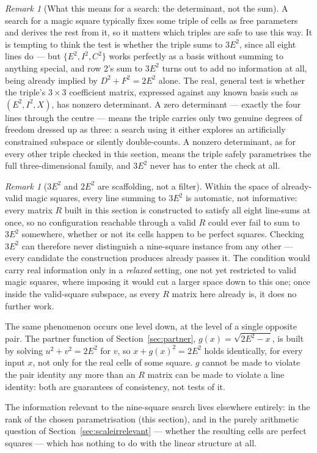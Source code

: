 \documentclass[12pt]{article}
\theoremstyle{remark}
\newtheorem{remark}[theorem]{Remark}
\begin{document}
\begin{remark}[What this means for a search: the determinant, not the sum]
A search for a magic square typically fixes some triple of cells as
free parameters and derives the rest from it, so it matters which
triples are safe to use this way. It is tempting to think the test is
whether the triple sums to $3E^2$, since all eight lines do --- but
$\{E^2,I^2,C^2\}$ works perfectly as a basis without summing to
anything special, and row 2's sum to $3E^2$ turns out to add no
information at all, being already implied by $D^2+F^2=2E^2$ alone.
The real, general test is whether the triple's $3\times3$ coefficient
matrix, expressed against any known basis such as $(E^2,I^2,X)$, has
nonzero determinant. A zero determinant --- exactly the four lines
through the centre --- means the triple carries only two genuine
degrees of freedom dressed up as three: a search using it either
explores an artificially constrained subspace or silently
double-counts. A nonzero determinant, as for every other triple
checked in this section, means the triple safely parametrises the
full three-dimensional family, and $3E^2$ never has to enter the
check at all.
\end{remark}

\begin{remark}[$3E^2$ and $2E^2$ are scaffolding, not a filter]
Within the space of already-valid magic squares, every line summing
to $3E^2$ is automatic, not informative: every matrix $R$ built in
this section is constructed to satisfy all eight line-sums at once,
so no configuration reachable through a valid $R$ could ever fail to
sum to $3E^2$ somewhere, whether or not its cells happen to be
perfect squares. Checking $3E^2$ can therefore never distinguish a
nine-square instance from any other --- every candidate the
construction produces already passes it. The condition would carry
real information only in a \emph{relaxed} setting, one not yet
restricted to valid magic squares, where imposing it would cut a
larger space down to this one; once inside the valid-square subspace,
as every $R$ matrix here already is, it does no further work.

The same phenomenon occurs one level down, at the level of a single
opposite pair. The partner function of Section~\ref{sec:partner},
$g(x) = \sqrt{2E^2 - x}$, is built by solving $u^2+v^2=2E^2$ for $v$,
so $x + g(x)^2 = 2E^2$ holds identically, for every input $x$, not
only for the real cells of some square. $g$ cannot be made to violate
the pair identity any more than an $R$ matrix can be made to violate
a line identity: both are guarantees of consistency, not tests of it.

The information relevant to the nine-square search lives elsewhere
entirely: in the rank of the chosen parametrisation (this section),
and in the purely arithmetic question of Section~\ref{sec:scaleirrelevant}
--- whether the resulting cells are perfect squares --- which has
nothing to do with the linear structure at all.
\end{remark}
\end{document}
